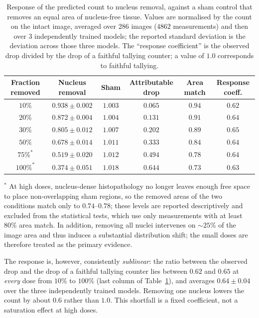 \documentclass[preprint,12pt]{elsarticle}
\begin{document}
\begin{table}[!htbp]
\centering
\caption{Response of the predicted count to nucleus removal, against a sham control that removes an equal area
of nucleus-free tissue. Values are normalised by the count on the intact image, averaged over $286$ images
($4862$ measurements) and then over $3$ independently trained models; the reported standard deviation is the
deviation across those three models. The ``response coefficient'' is the observed drop divided by the drop of a
faithful tallying counter; a value of $1.0$ corresponds to faithful tallying.}\label{tab:doseresp}
\footnotesize
\setlength{\tabcolsep}{5pt}
\begin{tabular}{@{}cccccc@{}}
\toprule
Fraction removed & Nucleus removal & Sham & Attributable drop & Area match & Response coeff. \\
\midrule
$10\%$  & $0.938\pm0.002$ & $1.003$ & $0.065$ & $0.94$ & $0.62$ \\
$20\%$  & $0.872\pm0.004$ & $1.004$ & $0.131$ & $0.91$ & $0.64$ \\
$30\%$  & $0.805\pm0.012$ & $1.007$ & $0.202$ & $0.89$ & $0.65$ \\
$50\%$  & $0.678\pm0.014$ & $1.011$ & $0.333$ & $0.84$ & $0.64$ \\
$75\%^{\ast}$  & $0.519\pm0.020$ & $1.012$ & $0.494$ & $0.78$ & $0.64$ \\
$100\%^{\ast}$ & $0.374\pm0.051$ & $1.018$ & $0.644$ & $0.73$ & $0.63$ \\
\bottomrule
\end{tabular}

\vspace{4pt}
\begin{minipage}{\textwidth}\footnotesize
$^{\ast}$ At high doses, nucleus-dense histopathology no longer leaves enough free space to place
non-overlapping sham regions, so the removed areas of the two conditions match only to $0.74$--$0.78$; these
levels are reported descriptively and excluded from the statistical tests, which use only measurements with at
least $80\%$ area match. In addition, removing all nuclei intervenes on ${\sim}25\%$ of the image area and thus
induces a substantial distribution shift; the small doses are therefore treated as the primary evidence.
\end{minipage}
\end{table}

The response is, however, consistently \emph{sublinear}: the ratio between the observed drop and the drop of a
faithful tallying counter lies between $0.62$ and $0.65$ at \emph{every} dose from $10\%$ to $100\%$ (last
column of Table~\ref{tab:doseresp}), and averages $0.64 \pm 0.04$ over the three independently trained models.
Removing one nucleus lowers the count by about $0.6$ rather than $1.0$. This shortfall is a fixed coefficient,
not a saturation effect at high doses.
\end{document}
